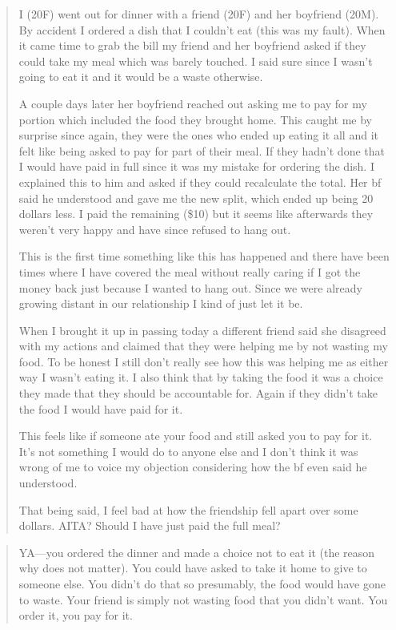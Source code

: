 \begin{quote}
I (20F) went out for dinner with a friend (20F) and her boyfriend
(20M). By accident I ordered a dish that I couldn't eat (this was my
fault). When it came time to grab the bill my friend and her boyfriend
asked if they could take my meal which was barely touched. I said sure
since I wasn't going to eat it and it would be a waste otherwise.

A couple days later her boyfriend reached out asking me to pay for my
portion which included the food they brought home. This caught me by
surprise since again, they were the ones who ended up eating it all and
it felt like being asked to pay for part of their meal. If they hadn't
done that I would have paid in full since it was my mistake for ordering
the dish. I explained this to him and asked if they could recalculate
the total. Her bf said he understood and gave me the new split, which
ended up being 20 dollars less. I paid the remaining (\$10) but it seems
like afterwards they weren't very happy and have since refused to hang
out.

This is the first time something like this has happened and there have
been times where I have covered the meal without really caring if I got
the money back just because I wanted to hang out. Since we were already
growing distant in our relationship I kind of just let it be.

When I brought it up in passing today a different friend said she
disagreed with my actions and claimed that they were helping me by not
wasting my food. To be honest I still don't really see how this was
helping me as either way I wasn't eating it. I also think that by taking
the food it was a choice they made that they should be accountable for.
Again if they didn't take the food I would have paid for it.

This feels like if someone ate your food and still asked you to pay for
it. It's not something I would do to anyone else and I don't think it
was wrong of me to voice my objection considering how the bf even said
he understood.

That being said, I feel bad at how the friendship fell apart over some
dollars. AITA? Should I have just paid the full meal?
\end{quote}


\begin{quote}
YA---you ordered the dinner and made a choice not to eat it (the reason
why does not matter). You could have asked to take it home to give to
someone else. You didn't do that so presumably, the food would have
gone to waste. Your friend is simply not wasting food that you didn't
want. You order it, you pay for it.
\end{quote}

